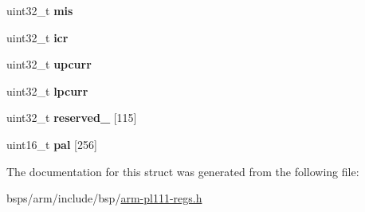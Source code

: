 \begin{DoxyCompactItemize}
uint32\+\_\+t {\bfseries mis}
\item 
\mbox{\label{structpl111__lcd_ab765cf002839884fc934c48746199be6}} 
uint32\+\_\+t {\bfseries icr}
\item 
\mbox{\label{structpl111__lcd_ab84544c90ec27f5747306b3e41c768dc}} 
uint32\+\_\+t {\bfseries upcurr}
\item 
\mbox{\label{structpl111__lcd_a40307b90fdd09bd66c1e303f53bc3de8}} 
uint32\+\_\+t {\bfseries lpcurr}
\item 
\mbox{\label{structpl111__lcd_abe30e834148a854debb667b8d3f9311d}} 
uint32\+\_\+t {\bfseries reserved\+\_} \mbox{[}115\mbox{]}
\item 
\mbox{\label{structpl111__lcd_abc87adbe54a84452ef2f04b618469757}} 
uint16\+\_\+t {\bfseries pal} \mbox{[}256\mbox{]}
\end{DoxyCompactItemize}


The documentation for this struct was generated from the following file\+:\begin{DoxyCompactItemize}
\item 
bsps/arm/include/bsp/\mbox{\hyperlink{arm-pl111-regs_8h}{arm-\/pl111-\/regs.\+h}}\end{DoxyCompactItemize}
